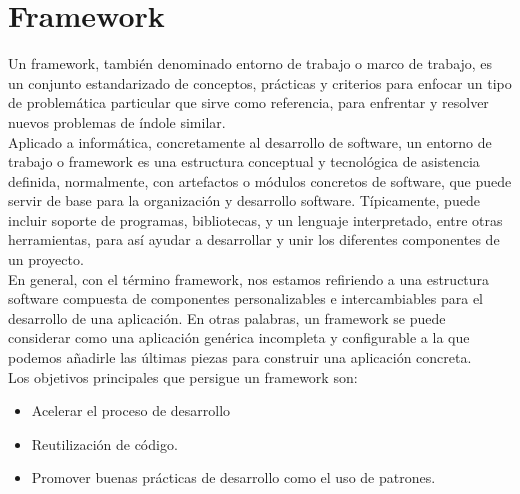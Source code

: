 \section{Framework}
\label{sec:def-Framework}

Un framework, también denominado entorno de trabajo o marco de trabajo, es un conjunto estandarizado de conceptos, prácticas y criterios para enfocar un tipo de problemática particular que sirve como
referencia, para enfrentar y resolver nuevos problemas de índole similar.\\

Aplicado a informática, concretamente al desarrollo de software, un entorno de trabajo o framework es una estructura conceptual y tecnológica de asistencia definida, normalmente, con artefactos o 
módulos concretos de software, que puede servir de base para la organización y desarrollo software. Típicamente, puede incluir soporte de programas, bibliotecas, y un lenguaje interpretado, entre 
otras herramientas, para así ayudar a desarrollar y unir los diferentes componentes de un proyecto.\\

En  general,  con  el  término  framework, nos estamos refiriendo a una estructura software compuesta de componentes personalizables e intercambiables para el
desarrollo de una aplicación. En otras palabras, un framework se puede considerar como una aplicación genérica incompleta y configurable a la que podemos añadirle las últimas 
piezas para construir una aplicación concreta.\\

Los objetivos principales que persigue un framework son:

\begin{itemize}
 \item Acelerar el proceso de desarrollo
 \item Reutilización de código.
 \item Promover buenas prácticas de desarrollo como el uso de patrones.
\end{itemize}


